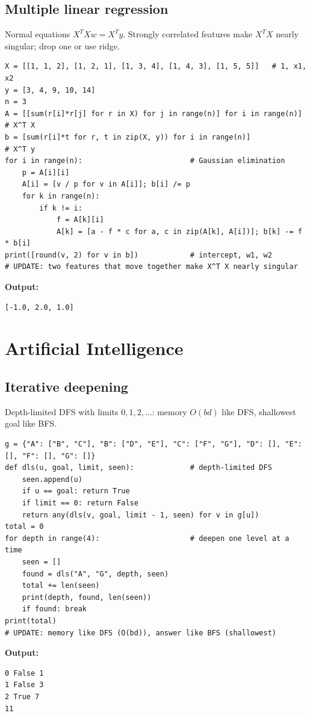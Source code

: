 \documentclass[11pt]{article}
\begin{document}
\subsection*{Multiple linear regression}
Normal equations $X^TXw=X^Ty$. Strongly correlated features make $X^TX$ nearly singular; drop one or use ridge.
\begin{Verbatim}[fontsize=\footnotesize,frame=single]
X = [[1, 1, 2], [1, 2, 1], [1, 3, 4], [1, 4, 3], [1, 5, 5]]   # 1, x1, x2
y = [3, 4, 9, 10, 14]
n = 3
A = [[sum(r[i]*r[j] for r in X) for j in range(n)] for i in range(n)]   # X^T X
b = [sum(r[i]*t for r, t in zip(X, y)) for i in range(n)]               # X^T y
for i in range(n):                         # Gaussian elimination
    p = A[i][i]
    A[i] = [v / p for v in A[i]]; b[i] /= p
    for k in range(n):
        if k != i:
            f = A[k][i]
            A[k] = [a - f * c for a, c in zip(A[k], A[i])]; b[k] -= f * b[i]
print([round(v, 2) for v in b])            # intercept, w1, w2
# UPDATE: two features that move together make X^T X nearly singular
\end{Verbatim}
\textbf{Output:}
\begin{Verbatim}[fontsize=\footnotesize,frame=single]
[-1.0, 2.0, 1.0]
\end{Verbatim}
\section{Artificial Intelligence}
\subsection*{Iterative deepening}
Depth-limited DFS with limits $0,1,2,\dots$: memory $O(bd)$ like DFS, shallowest goal like BFS.
\begin{Verbatim}[fontsize=\footnotesize,frame=single]
g = {"A": ["B", "C"], "B": ["D", "E"], "C": ["F", "G"], "D": [], "E": [], "F": [], "G": []}
def dls(u, goal, limit, seen):             # depth-limited DFS
    seen.append(u)
    if u == goal: return True
    if limit == 0: return False
    return any(dls(v, goal, limit - 1, seen) for v in g[u])
total = 0
for depth in range(4):                     # deepen one level at a time
    seen = []
    found = dls("A", "G", depth, seen)
    total += len(seen)
    print(depth, found, len(seen))
    if found: break
print(total)
# UPDATE: memory like DFS (O(bd)), answer like BFS (shallowest)
\end{Verbatim}
\textbf{Output:}
\begin{Verbatim}[fontsize=\footnotesize,frame=single]
0 False 1
1 False 3
2 True 7
11
\end{Verbatim}
\end{document}
